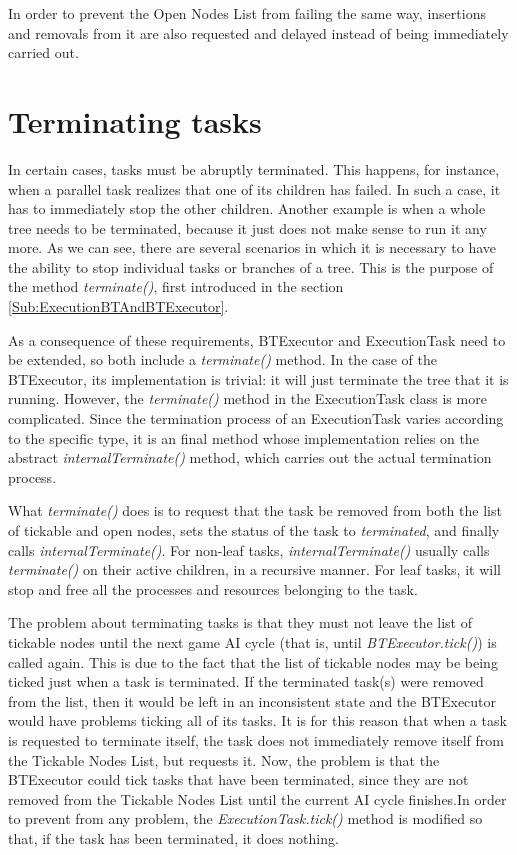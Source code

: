 \documentclass[a4paper,10pt]{article}
\begin{document}
In order to prevent the Open Nodes List from failing the same way, insertions and removals from it are also requested and delayed instead of being immediately carried out. 

\section{Terminating tasks}\label{Sub:TerminatingTasks}

In certain cases, tasks must be abruptly terminated. This happens, for instance, when a parallel task realizes that one of its children has failed. In such a case, it has to immediately stop the other children. Another example is when a whole tree needs to be terminated, because it just does not make sense to run it any more. As we can see, there are several scenarios in which it is necessary to have the ability to stop individual tasks or branches of a tree. This is the purpose of the method \textit{terminate()}, first introduced in the section \ref{Sub:ExecutionBTAndBTExecutor}.

As a consequence of these requirements, BTExecutor and ExecutionTask need to be extended, so both include a \textit{terminate()} method. In the case of the BTExecutor, its implementation is trivial: it will just terminate the tree that it is running. However, the \textit{terminate()} method in the ExecutionTask class is more complicated. Since the termination process of an ExecutionTask varies according to the specific type, it is an final method whose implementation relies on the abstract \textit{internalTerminate()} method, which carries out the actual termination process.

What \textit{terminate()} does is to request that the task be removed from both the list of tickable and open nodes, sets the status of the task to \textit{terminated}, and finally calls \textit{internalTerminate()}. For non-leaf tasks, \textit{internalTerminate()} usually calls \textit{terminate()} on their active children, in a recursive manner. For leaf tasks, it will stop and free all the processes and resources belonging to the task.

The problem about terminating tasks is that they must not leave the list of tickable nodes until the next game AI cycle (that is, until \textit{BTExecutor.tick()}) is called again. This is due to the fact that the list of tickable nodes may be being ticked just when a task is terminated. If the terminated task(s) were removed from the list, then it would be left in an inconsistent state and the BTExecutor would have problems ticking all of its tasks. It is for this reason that when a task is requested to terminate itself, the task does not immediately remove itself from the Tickable Nodes List, but requests it. Now, the problem is that the BTExecutor could tick tasks that have been terminated, since they are not removed from the Tickable Nodes List until the current AI cycle finishes.In order to prevent from any problem, the \textit{ExecutionTask.tick()} method is modified so that, if the task has been terminated, it does nothing.
\end{document}
